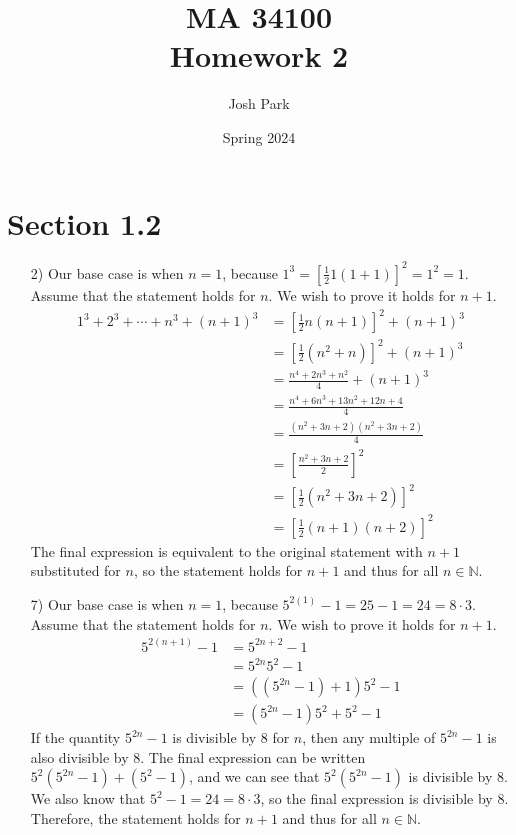 \documentclass[11pt]{article}
\author{Josh Park}
\date{Spring 2024}
\title{MA 34100 \\Homework 2}
\newcommand{\N}{\mathbb{N}}    %
\begin{document}
  \maketitle
  \section*{Section 1.2}
  \begin{enumerate}
    \item[2)] Our base case is when $n=1$, because $1^3 = {[\frac{1}{2}1(1+1)]}^2 = 1^2 = 1$. \\
      Assume that the statement holds for $n$. We wish to prove it holds for $n+1$.
      \begin{align}
        1^3+2^3+\cdots+n^3+(n+1)^3 &= \left[\frac{1}{2}n(n+1) \right]^2+(n+1)^3 \\
                                   &= \left[\frac{1}{2}(n^2+n) \right]^2+(n+1)^3 \\
                                   &= \frac{n^4+2n^3+n^2}{4}+(n+1)^3 \\
                                   &= \frac{n^4+6n^3+13n^2+12n+4}{4} \\
                                   &= \frac{(n^2+3n+2)(n^2+3n+2)}{4} \\
                                   &= \left[\frac{n^2+3n+2}{2}\right]^2 \\
                                   &= \left[\frac{1}{2}(n^2+3n+2) \right]^2 \\
                                   &= \left[\frac{1}{2}(n+1)(n+2) \right]^2
      \end{align}
      The final expression is equivalent to the original statement with $n+1$ substituted for $n$, so the statement holds for $n+1$ and thus for all $n \in \N$.

    \item[7)] Our base case is when $n=1$, because $5^{2(1)}-1 = 25-1 = 24 = 8 \cdot3$. \\
        Assume that the statement holds for $n$. We wish to prove it holds for $n+1$. \\
        \begin{align}
          5^{2(n+1)}-1 &= 5^{2n+2} - 1 \\
                       &= 5^{2n}5^2 - 1 \\
                       &= ((5^{2n}-1)+1)5^2 - 1 \\
                       &= (5^{2n}-1)5^2+5^2 - 1
        \end{align}
        If the quantity $5^{2n}-1$ is divisible by 8 for $n$, then any multiple of $5^{2n}-1$ is also divisible by 8. The final expression can be written $5^2(5^{2n}-1)+(5^2 - 1)$, and we can see that $5^2(5^{2n}-1)$ is divisible by 8. We also know that $5^2-1 = 24 = 8 \cdot3$, so the final expression is divisible by 8. Therefore, the statement holds for $n+1$ and thus for all $n \in \N$.


\end{enumerate}
\end{document}
